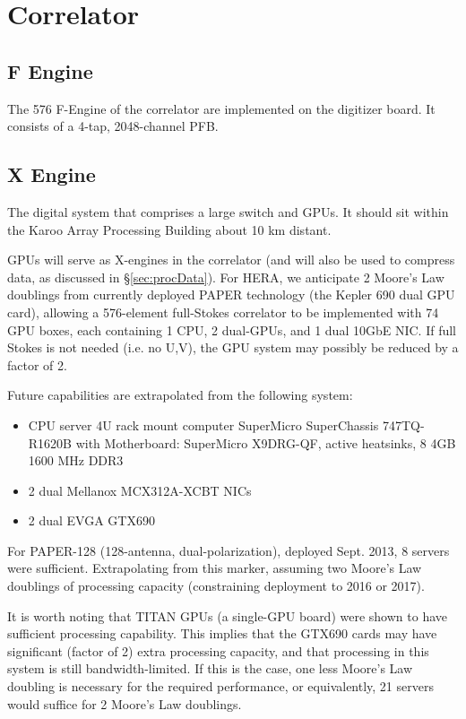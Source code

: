 \documentclass[11pt]{article}
\begin{document}
\section{Correlator}

\subsection{F Engine}
The 576 F-Engine of the correlator are implemented on the digitizer board.  It consists of a 4-tap, 2048-channel
PFB.

\subsection{X Engine}
The digital system that comprises a large switch and GPUs.  It should sit within the Karoo Array Processing
Building about 10 km distant.

GPUs will serve as X-engines in the correlator (and will also be used to compress data, as discussed 
in \S\ref{sec:procData}). For HERA, we anticipate 2 Moore's Law doublings from currently deployed PAPER
technology (the Kepler 690 dual GPU card), allowing a 576-element full-Stokes correlator to be implemented with
74 GPU boxes, each containing 1 CPU, 2 dual-GPUs, and 1 dual 10GbE NIC.
If full Stokes is not needed (i.e. no U,V), the GPU system may possibly be reduced by a factor of 2.

Future capabilities are extrapolated from the following system:
\begin{itemize}
\item CPU server 4U rack mount computer SuperMicro SuperChassis 747TQ-R1620B with Motherboard: SuperMicro X9DRG-QF, active heatsinks, 8 4GB 1600 MHz DDR3
\item 2 dual Mellanox MCX312A-XCBT NICs
\item 2 dual EVGA GTX690
\end{itemize}

For PAPER-128 (128-antenna, dual-polarization), deployed Sept. 2013, 8 servers were sufficient.
Extrapolating from this marker, assuming two Moore's Law doublings of processing capacity (constraining
deployment to 2016 or 2017).

It is worth noting that TITAN GPUs (a single-GPU board) were shown to have sufficient processing
capability.  This implies that the GTX690 cards may have significant (factor of 2) extra processing
capacity, and that processing in this system is still bandwidth-limited.  If this is the case,
one less Moore's Law doubling is necessary for the required performance, or equivalently, 21 servers
would suffice for 2 Moore's Law doublings.
\end{document}
